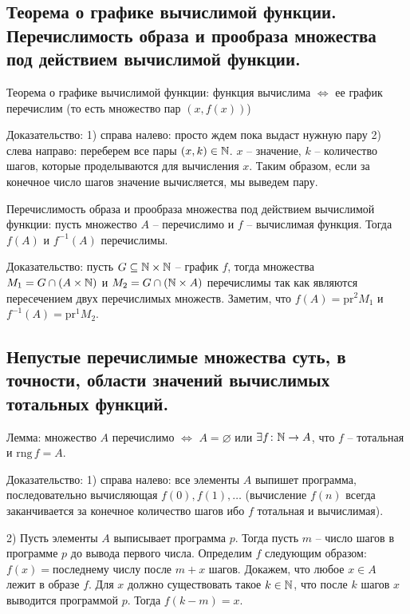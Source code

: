 \documentclass[a4paper, 10pt]{article}
\begin{document}
\subsection{Теорема о графике вычислимой функции. Перечислимость образа и прообраза множества под действием вычислимой функции.}

Теорема о графике вычислимой функции: функция вычислима $\iff$ ее график перечислим (то есть множество пар $(x,f(x))$)

Доказательство: 1) справа налево: просто ждем пока выдаст нужную пару
2) слева направо: переберем все пары $(x,k)\in\mathbb{N}$. $x$ -- значение, $k$ -- количество шагов, которые проделываются для вычисления $x$. Таким образом, если за конечное число шагов значение вычисляется, мы выведем пару.

\hfill

Перечислимость образа и прообраза множества под действием вычислимой функции: пусть множество $A$ -- перечислимо и $f$ -- вычислимая функция. Тогда $f(A)$ и $f^{-1}(A)$ перечислимы.

Доказательство: пусть $G\subseteq\mathbb{N}\times\mathbb{N}$ -- график $f$, тогда множества $M_1=G\cap(A\times\mathbb{N})$ и $M_2=G\cap(\mathbb{N}\times A)$ перечислимы так как являются пересечением двух перечислимых множеств. Заметим, что $f(A)=\text{pr}^2 M_1$ и $f^{-1}(A)=\text{pr}^1 M_2$.

\subsection{Непустые перечислимые множества суть, в точности, области значений вычислимых тотальных функций.}

Лемма: множество $A$ перечислимо $\iff$ $A=\varnothing$ или $\exists f\colon \mathbb{N}\to A$, что $f$ -- тотальная и $\text{rng}\, f=A$.

Доказательство: 1) справа налево: все элементы $A$ выпишет программа, последовательно вычисляющая $f(0),f(1),\ldots$ (вычисление $f(n)$ всегда заканчивается за конечное количество шагов ибо $f$ тотальная и вычислимая).

2) Пусть элементы $A$ выписывает программа $p$. Тогда пусть $m$ -- число шагов в программе $p$ до вывода первого числа. Определим $f$ следующим образом: $f(x)=$последнему числу после $m+x$ шагов. Докажем, что любое $x\in A$ лежит в образе $f$. Для $x$ должно существовать такое $k\in\mathbb{N}$, что после $k$ шагов $x$ выводится программой $p$. Тогда $f(k-m)=x$.
\end{document}
